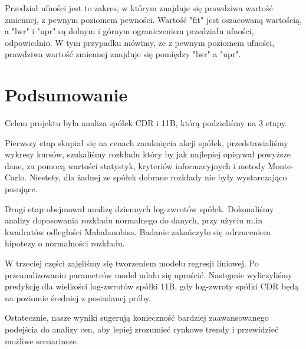 \documentclass[a4paper,11pt]{article}
\def\\{\hfill\break}
\begin{document}
Przedział ufności jest to zakres, w którym znajduje się prawdziwa wartość zmiennej, z pewnym poziomem pewności. Wartość "fit" jest oszacowaną wartością, a "lwr" i "upr" są dolnym i górnym ograniczeniem przedziału ufności, odpowiednio. W tym przypadku mówimy, że z pewnym poziomem ufności, prawdziwa wartość zmiennej znajduje się pomiędzy "lwr" a "upr". 

\section{Podsumowanie}
Celem projektu była analiza spółek CDR i 11B, którą podzieliśmy na 3 etapy.
\\

Pierwszy etap skupiał się na cenach zamknięcia akcji spółek, przedstawialiśmy wykresy kursów, szukaliśmy rozkładu który by jak najlepiej opisywał powyższe dane, za pomocą wartości statystyk, kryteriów informacyjnych i metody Monte-Carlo. Niestety, dla żadnej ze spółek dobrane rozkłady nie były wystarczająco pasujące. 
\\

Drugi etap obejmował analizę dziennych log-zwrotów spółek. Dokonaliśmy analizy dopasowania rozkładu normalnego do danych, przy użyciu m.in kwadratów odległości Mahalanobisa. Badanie zakończyło się odrzuceniem hipotezy o normalności rozkładu. 
\\

W trzeciej części zajęliśmy się tworzeniem modelu regresji liniowej. Po przeanalizowaniu parametrów model udało się uprościć. Następnie wyliczyliśmy predykcję dla wielkości log-zwrotów spółki 11B, gdy log-zwroty spółki CDR będą na poziomie średniej z posiadanej próby.
\\

Ostatecznie, nasze wyniki sugerują konieczność bardziej zaawansowanego podejścia do analizy cen, aby lepiej zrozumieć rynkowe trendy i przewidzieć możliwe scenariusze.
\end{document}
